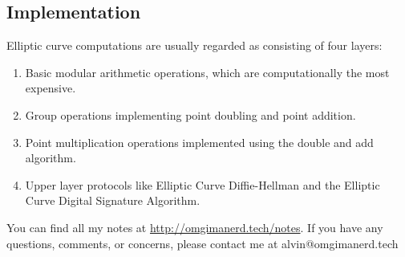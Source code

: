 \documentclass{math}
\begin{document}
\subsection*{Implementation}
Elliptic curve computations are usually regarded as consisting of four layers:
\begin{enumerate}
  \item Basic modular arithmetic operations, which are computationally the most
  expensive.
  \item Group operations implementing point doubling and point addition.
  \item Point multiplication operations implemented using the double and add
  algorithm.
  \item Upper layer protocols like Elliptic Curve Diffie-Hellman and the
  Elliptic Curve Digital Signature Algorithm.
\end{enumerate}

\begin{center}
  You can find all my notes at \url{http://omgimanerd.tech/notes}. If you have
  any questions, comments, or concerns, please contact me at
  alvin@omgimanerd.tech
\end{center}
\end{document}
